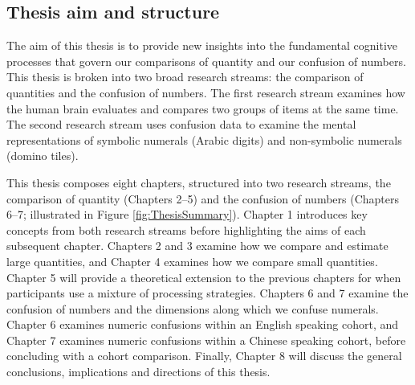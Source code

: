 


\subsection{Thesis aim and structure}
The aim of this thesis is to provide new insights into the fundamental cognitive processes that govern our comparisons of quantity and our confusion of numbers. This thesis is broken into two broad research streams: the comparison of quantities and the confusion of numbers. The first research stream examines how the human brain evaluates and compares two groups of items at the same time. The second research stream uses confusion data to examine the mental representations of symbolic numerals (\eg Arabic digits) and non-symbolic numerals (\eg domino tiles). 

This thesis composes eight chapters, structured into two research streams, the comparison of quantity (Chapters 2--5) and the confusion of numbers (Chapters 6--7; illustrated in Figure \ref{fig:ThesisSummary}). Chapter 1 introduces key concepts from both research streams before highlighting the aims of each subsequent chapter. Chapters 2 and 3 examine how we compare and estimate large quantities, and Chapter 4 examines how we compare small quantities. Chapter 5 will provide a theoretical extension to the previous chapters for when participants use a mixture of processing strategies. Chapters 6 and 7 examine the confusion of numbers and the dimensions along which we confuse numerals. Chapter 6 examines numeric confusions within an English speaking cohort, and Chapter 7 examines numeric confusions within a Chinese speaking cohort, before concluding with a cohort comparison. Finally, Chapter 8 will discuss the general conclusions, implications and directions of this thesis.

